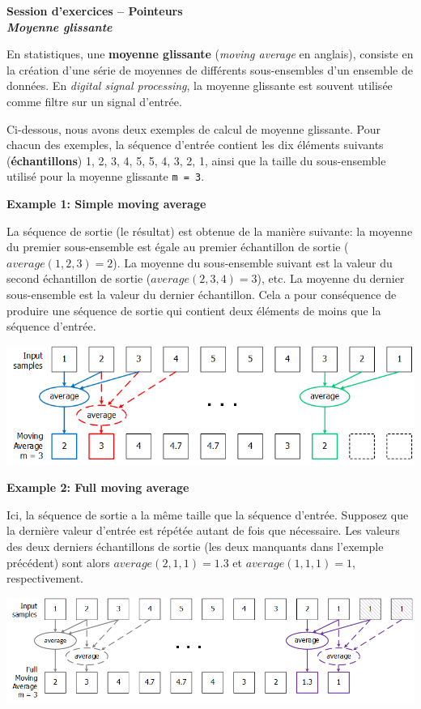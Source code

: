\documentclass[11pt]{article}
\begin{document}
\begin{center}{\bf Session d'exercices -- Pointeurs}\\
\textbf{\emph{Moyenne glissante}}
\end{center}

En statistiques, une \textbf{moyenne glissante} (\textit{moving average} en anglais), consiste en la création d'une série de moyennes de différents sous-ensembles d'un ensemble de données.
En \textit{digital signal processing}, la moyenne glissante est souvent utilisée comme filtre sur un signal d'entrée.

Ci-dessous, nous avons deux exemples de calcul de moyenne glissante.
Pour chacun des exemples, la séquence d'entrée contient les dix éléments suivants (\textbf{échantillons}) 1, 2, 3, 4, 5, 5, 4, 3, 2, 1, ainsi que la taille du sous-ensemble utilisé pour la moyenne glissante \texttt{m = 3}.

\textbf{Example 1: Simple moving average}

La séquence de sortie (le résultat) est obtenue de la manière suivante: la moyenne du premier sous-ensemble est égale au premier échantillon de sortie ($average(1, 2, 3) = 2$).
La moyenne du sous-ensemble suivant est la valeur du second échantillon de sortie ($average(2, 3, 4) = 3$), etc.
La moyenne du dernier sous-ensemble est la valeur du dernier échantillon.
Cela a pour conséquence de produire une séquence de sortie qui contient deux éléments de moins que la séquence d'entrée.

\begin{center}
\includegraphics[scale=0.65]{Figures/MovAvg3.png}
\end{center}

\textbf{Example 2: Full moving average}

Ici, la séquence de sortie a la même taille que la séquence d'entrée.
Supposez que la dernière valeur d'entrée est répétée autant de fois que nécessaire.
Les valeurs des deux derniers échantillons de sortie (les deux manquants dans l'exemple précédent) sont alors $average(2,1,1) = 1.3$ et $average(1,1,1) = 1$, respectivement.
\begin{center}
\includegraphics[scale=0.65]{Figures/FullMovAvg3.png}
\end{center}
\end{document}
